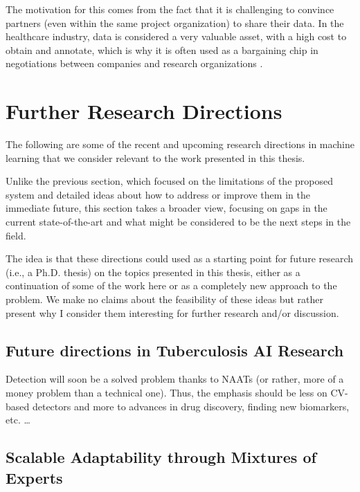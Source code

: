 \documentclass[../main.tex]{subfiles}
\begin{document}
    The motivation for this comes from the fact that it is challenging to convince partners (even within the same project organization) to share their data. In the healthcare industry, data is considered a very valuable asset, with a high cost to obtain and annotate, which is why it is often used as a bargaining chip in negotiations between companies and research organizations .



    \section{Further Research Directions} \label{conclusions:research_directions} 

    The following are some of the recent and upcoming research directions in machine learning that we consider relevant to the work presented in this thesis.
    
    Unlike the previous section, which focused on the limitations of the proposed system and detailed ideas about how to address or improve them in the immediate future, this section takes a broader view, focusing on gaps in the current state-of-the-art and what might be considered to be the next steps in the field.
    
    The idea is that these directions could used as a starting point for future research (i.e., a Ph.D. thesis) on the topics presented in this thesis, either as a continuation of some of the work here or as a completely new approach to the problem. We make no claims about the feasibility of these ideas but rather present why I consider them interesting for further research and/or discussion.


    \subsection{Future directions in Tuberculosis AI Research} \label{conclusions:future_work:tb_ai} 
    
    Detection will soon be a solved problem thanks to NAATs (or rather, more of a money problem than a technical one). Thus, the emphasis should be less on CV-based detectors and more to advances in drug discovery, finding new biomarkers, etc. \dots



    \subsection{Scalable Adaptability through Mixtures of Experts} \label{conclusions:research_directions:moes} 
\end{document}
